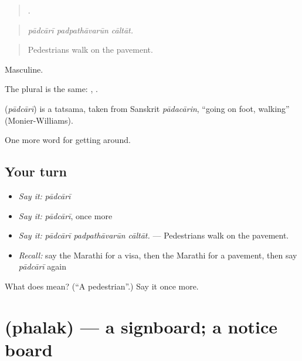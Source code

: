\begin{quote}
  .
\end{quote}

\begin{quote}
\emph{pādcārī padpathāvarūn cāltāt.}
\end{quote}

\begin{quote}
Pedestrians walk on the pavement.
\end{quote}

Masculine.

The plural is the same:  ,  .

\begin{cousinweb}
\textbf{} (\emph{pādcārī}) is a tatsama, taken from Sanskrit \emph{pādacārin}, \textquotedblleft{}going on foot, walking\textquotedblright{} (Monier-Williams).
\end{cousinweb}

\begin{grammarlens}[title={What you've built}]
One more word for getting around.
\end{grammarlens}

\subsection*{Your turn}
\begin{itemize}
\raggedright
  \item \emph{Say it:} \emph{pādcārī}
  \item \emph{Say it:} \emph{pādcārī}, once more
  \item \emph{Say it:} \emph{pādcārī padpathāvarūn cāltāt.} — Pedestrians walk on the pavement.
  \item \emph{Recall:} say the Marathi for a visa, then the Marathi for a pavement, then say \emph{pādcārī} again
\end{itemize}

\begin{tcolorbox}[breakable,colback=teal!4,colframe=teal!35!black,title={Before you move on}]
What does  mean? (\textquotedblleft{}A pedestrian\textquotedblright{}.) Say it once more.
\end{tcolorbox}
\section[\texorpdfstring{\mr{फलक} (phalak)}{फलक (phalak)}]{ (phalak) — a signboard; a notice board}

